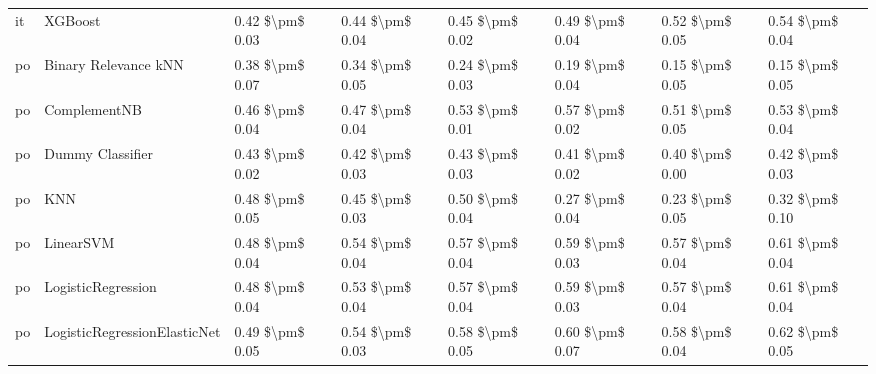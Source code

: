 \begin{tabular}{llllllll}
      it &                         XGBoost & 0.42 \$\textbackslash pm\$ 0.03 &           0.44 \$\textbackslash pm\$ 0.04 &       0.45 \$\textbackslash pm\$ 0.02 &        0.49 \$\textbackslash pm\$ 0.04 &                         0.52 \$\textbackslash pm\$ 0.05 &     0.54 \$\textbackslash pm\$ 0.04 \\
      po &            Binary Relevance kNN & 0.38 \$\textbackslash pm\$ 0.07 &           0.34 \$\textbackslash pm\$ 0.05 &       0.24 \$\textbackslash pm\$ 0.03 &        0.19 \$\textbackslash pm\$ 0.04 &                         0.15 \$\textbackslash pm\$ 0.05 &     0.15 \$\textbackslash pm\$ 0.05 \\
      po &                    ComplementNB & 0.46 \$\textbackslash pm\$ 0.04 &           0.47 \$\textbackslash pm\$ 0.04 &       0.53 \$\textbackslash pm\$ 0.01 &        0.57 \$\textbackslash pm\$ 0.02 &                         0.51 \$\textbackslash pm\$ 0.05 &     0.53 \$\textbackslash pm\$ 0.04 \\
      po &                Dummy Classifier & 0.43 \$\textbackslash pm\$ 0.02 &           0.42 \$\textbackslash pm\$ 0.03 &       0.43 \$\textbackslash pm\$ 0.03 &        0.41 \$\textbackslash pm\$ 0.02 &                         0.40 \$\textbackslash pm\$ 0.00 &     0.42 \$\textbackslash pm\$ 0.03 \\
      po &                             KNN & 0.48 \$\textbackslash pm\$ 0.05 &           0.45 \$\textbackslash pm\$ 0.03 &       0.50 \$\textbackslash pm\$ 0.04 &        0.27 \$\textbackslash pm\$ 0.04 &                         0.23 \$\textbackslash pm\$ 0.05 &     0.32 \$\textbackslash pm\$ 0.10 \\
      po &                       LinearSVM & 0.48 \$\textbackslash pm\$ 0.04 &           0.54 \$\textbackslash pm\$ 0.04 &       0.57 \$\textbackslash pm\$ 0.04 &        0.59 \$\textbackslash pm\$ 0.03 &                         0.57 \$\textbackslash pm\$ 0.04 &     0.61 \$\textbackslash pm\$ 0.04 \\
      po &              LogisticRegression & 0.48 \$\textbackslash pm\$ 0.04 &           0.53 \$\textbackslash pm\$ 0.04 &       0.57 \$\textbackslash pm\$ 0.04 &        0.59 \$\textbackslash pm\$ 0.03 &                         0.57 \$\textbackslash pm\$ 0.04 &     0.61 \$\textbackslash pm\$ 0.04 \\
      po &    LogisticRegressionElasticNet & 0.49 \$\textbackslash pm\$ 0.05 &           0.54 \$\textbackslash pm\$ 0.03 &       0.58 \$\textbackslash pm\$ 0.05 &        0.60 \$\textbackslash pm\$ 0.07 &                         0.58 \$\textbackslash pm\$ 0.04 &     0.62 \$\textbackslash pm\$ 0.05 \\

\end{tabular}
